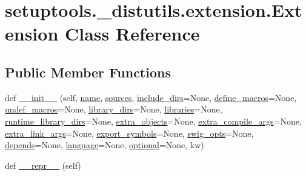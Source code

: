 \hypertarget{classsetuptools_1_1__distutils_1_1extension_1_1Extension}{}\section{setuptools.\+\_\+distutils.\+extension.\+Extension Class Reference}
\label{classsetuptools_1_1__distutils_1_1extension_1_1Extension}
\subsection*{Public Member Functions}
\begin{DoxyCompactItemize}
\item 
def \hyperlink{classsetuptools_1_1__distutils_1_1extension_1_1Extension_a13788a24f343dcc4b445c1792a2b6f54}{\+\_\+\+\_\+init\+\_\+\+\_\+} (self, \hyperlink{classsetuptools_1_1__distutils_1_1extension_1_1Extension_a91644a6101da93d158002781bef307c6}{name}, \hyperlink{classsetuptools_1_1__distutils_1_1extension_1_1Extension_a7dda92c3a0744e7d6c8555748ce2db09}{sources}, \hyperlink{classsetuptools_1_1__distutils_1_1extension_1_1Extension_ae19b915384434d6cb0c96a999b5d40c0}{include\+\_\+dirs}=None, \hyperlink{classsetuptools_1_1__distutils_1_1extension_1_1Extension_acaa46c0f6787c347d69b1c9269a45474}{define\+\_\+macros}=None, \hyperlink{classsetuptools_1_1__distutils_1_1extension_1_1Extension_a8b95c2b363310e2394cb00325d9eb316}{undef\+\_\+macros}=None, \hyperlink{classsetuptools_1_1__distutils_1_1extension_1_1Extension_a93d40c6abbf2ac8d0fc38853294d5a56}{library\+\_\+dirs}=None, \hyperlink{classsetuptools_1_1__distutils_1_1extension_1_1Extension_a9514a67b35016fd344b765a0af3fc89e}{libraries}=None, \hyperlink{classsetuptools_1_1__distutils_1_1extension_1_1Extension_ae9802c6e9cb10ae2f98b6e6a4cc2c113}{runtime\+\_\+library\+\_\+dirs}=None, \hyperlink{classsetuptools_1_1__distutils_1_1extension_1_1Extension_a90b62ab18abc7ff1c3e6805df2495874}{extra\+\_\+objects}=None, \hyperlink{classsetuptools_1_1__distutils_1_1extension_1_1Extension_a9ce689aadadfa37187278fba269bc675}{extra\+\_\+compile\+\_\+args}=None, \hyperlink{classsetuptools_1_1__distutils_1_1extension_1_1Extension_a6e2256988f4cc2989e6f904f36884e1b}{extra\+\_\+link\+\_\+args}=None, \hyperlink{classsetuptools_1_1__distutils_1_1extension_1_1Extension_a646e18a5dd35cc6043c3c977b6d85d31}{export\+\_\+symbols}=None, \hyperlink{classsetuptools_1_1__distutils_1_1extension_1_1Extension_ad5d2384da1b82b387af8c04e16cdd22a}{swig\+\_\+opts}=None, \hyperlink{classsetuptools_1_1__distutils_1_1extension_1_1Extension_a6da640830d64f0b9048dc290efe5f833}{depends}=None, \hyperlink{classsetuptools_1_1__distutils_1_1extension_1_1Extension_a705d32bd45c9452d94ceb9d27d7be534}{language}=None, \hyperlink{classsetuptools_1_1__distutils_1_1extension_1_1Extension_aaa136ebcd9b26fcd8869d2ae82b77f1d}{optional}=None, kw)
\item 
def \hyperlink{classsetuptools_1_1__distutils_1_1extension_1_1Extension_ac5d5b70c3a158684630bbad94ac21da0}{\+\_\+\+\_\+repr\+\_\+\+\_\+} (self)
\end{DoxyCompactItemize}

